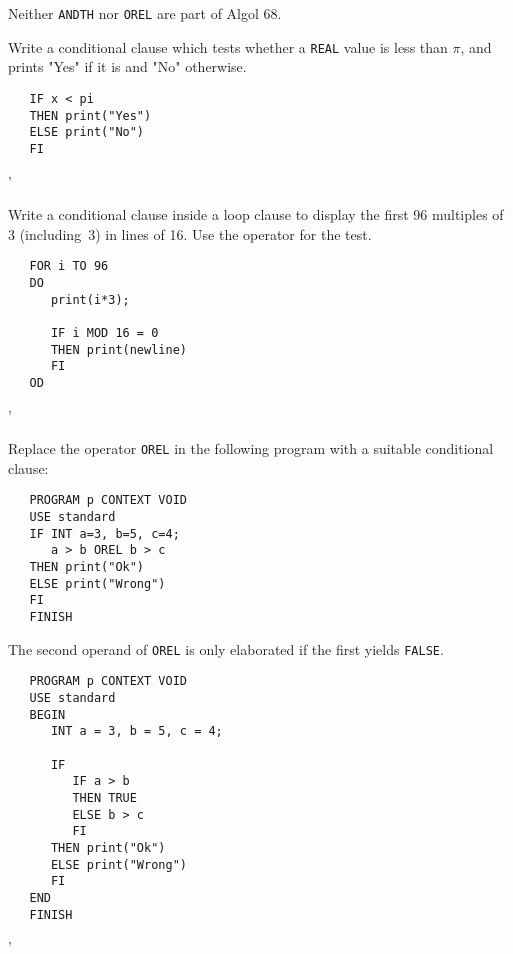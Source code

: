 Neither \verb|ANDTH| nor \verb|OREL| are part of Algol 68.

\begin{exercise}
\item Write a conditional clause which tests whether a \verb|REAL|
value is less than $\pi$, and prints "Yes" if it is and "No"
otherwise. \ans \ %
\begin{verbatim}
   IF x < pi
   THEN print("Yes")
   ELSE print("No")
   FI
\end{verbatim}
'
\item Write a conditional clause inside a loop clause to display the
first 96 multiples of 3 (including~3) in lines of 16. Use the
operator  for the test. \ans \ %
\begin{verbatim}
   FOR i TO 96
   DO
      print(i*3);

      IF i MOD 16 = 0
      THEN print(newline)
      FI
   OD
\end{verbatim}
'
\item Replace the operator \verb|OREL| in the following program with
a suitable conditional clause:
\begin{verbatim}
   PROGRAM p CONTEXT VOID
   USE standard
   IF INT a=3, b=5, c=4;
      a > b OREL b > c
   THEN print("Ok")
   ELSE print("Wrong")
   FI
   FINISH
\end{verbatim}
\indent\ans The second operand of \verb|OREL| is only elaborated if
the first yields \verb|FALSE|.
\begin{verbatim}
   PROGRAM p CONTEXT VOID
   USE standard
   BEGIN
      INT a = 3, b = 5, c = 4;

      IF
         IF a > b
         THEN TRUE
         ELSE b > c
         FI
      THEN print("Ok")
      ELSE print("Wrong")
      FI
   END
   FINISH
\end{verbatim}
'
\end{exercise}

